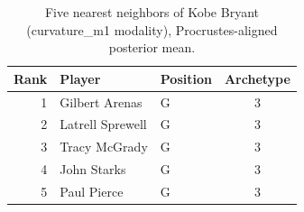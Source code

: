 \begin{table}[htbp]
  \centering\small
  \begin{tabular}{rllc}
    \toprule
    Rank & Player & Position & Archetype \\
    \midrule
    1 & Gilbert Arenas & G & 3 \\
    2 & Latrell Sprewell & G & 3 \\
    3 & Tracy McGrady & G & 3 \\
    4 & John Starks & G & 3 \\
    5 & Paul Pierce & G & 3 \\
    \bottomrule
  \end{tabular}
  \caption{Five nearest neighbors of Kobe Bryant (curvature_m1 modality), Procrustes-aligned posterior mean.}
  \label{tab:Kobe_Bryant_neighbors_curvature_m1}
\end{table}


